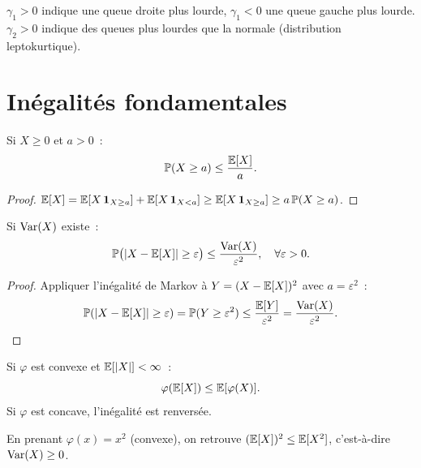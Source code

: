 \begin{remarque}
$\gamma_1 > 0$ indique une queue droite plus lourde, $\gamma_1 < 0$ une queue
gauche plus lourde. $\gamma_2 > 0$ indique des queues plus lourdes que la normale
(distribution leptokurtique).
\end{remarque}

\section{In\'egalit\'es fondamentales}

\begin{theoreme}
\label{thm:markov_ineq}
Si $X \geq 0$ et $a > 0$~:
\[
    \mathbb{P}(X \geq a) \leq \frac{\mathbb{E}[X]}{a}.
\]
\end{theoreme}

\begin{proof}
$\mathbb{E}[X] = \mathbb{E}[X\, \mathbf{1}_{X \geq a}] + \mathbb{E}[X\, \mathbf{1}_{X < a}]
\geq \mathbb{E}[X\, \mathbf{1}_{X \geq a}] \geq a\, \mathbb{P}(X \geq a)$.
\end{proof}

\begin{theoreme}
\label{thm:tchebychev}
Si $\mathrm{Var}(X)$ existe~:
\[
    \mathbb{P}\bigl(\left| X - \mathbb{E}[X] \right| \geq \varepsilon\bigr)
    \leq \frac{\mathrm{Var}(X)}{\varepsilon^2}, \quad \forall \varepsilon > 0.
\]
\end{theoreme}

\begin{proof}
Appliquer l'in\'egalit\'e de Markov \`a $Y = (X - \mathbb{E}[X])^2$ avec $a = \varepsilon^2$~:
\[
    \mathbb{P}(\left| X - \mathbb{E}[X] \right| \geq \varepsilon) = \mathbb{P}(Y \geq \varepsilon^2)
    \leq \frac{\mathbb{E}[Y]}{\varepsilon^2} = \frac{\mathrm{Var}(X)}{\varepsilon^2}. \qedhere
\]
\end{proof}

\begin{theoreme}
\label{thm:jensen}
Si $\varphi$ est convexe et $\mathbb{E}[\left| X \right|] < \infty$~:
\[
    \varphi(\mathbb{E}[X]) \leq \mathbb{E}[\varphi(X)].
\]
Si $\varphi$ est concave, l'in\'egalit\'e est renvers\'ee.
\end{theoreme}

\begin{exemple}
En prenant $\varphi(x) = x^2$ (convexe), on retrouve $(\mathbb{E}[X])^2 \leq \mathbb{E}[X^2]$,
c'est-\`a-dire $\mathrm{Var}(X) \geq 0$.
\end{exemple}

